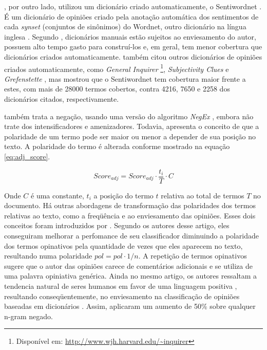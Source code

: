\documentclass[template.tex]{subfiles}
\begin{document}
, por outro lado, utilizou um dicionário criado automaticamente, o Sentiwordnet \cite{esuli2006sentiwordnet}. É um dicionário de opiniões criado pela anotação automática dos sentimentos de cada \textit{synset} (conjuntos de sinônimos) do Wordnet, outro dicionário na língua inglesa \cite{fellbaum2005wordnet}. Segundo , dicionários manuais estão sujeitos ao enviesamento do autor, possuem alto tempo gasto para construí-los e, em geral, tem menor cobertura que dicionários criados automaticamente.  também citou outros dicionários de opiniões criados automaticamente, como \textit{General Inquirer} \cite{stone1966general} \footnote{Disponível em: \url{http://www.wjh.harvard.edu/~inquirer}}, \textit{Subjectivity Clues} \cite{wilson2005recognizing} e \textit{Grefenstette} \cite{grefenstette2004coupling}, mas mostrou que o Sentiwordnet tem cobertura maior frente a estes, com mais de 28000 termos cobertos, contra 4216, 7650 e 2258 dos dicionários citados, respectivamente. 

 também trata a negação, usando uma versão do algoritmo \textit{NegEx} \cite{chapman2001evaluation}, embora não trate dos intensificadores e amenizadores. Todavia,  apresenta o conceito de que a polaridade de um termo pode ser maior ou menor a depender de sua posição no texto. A polaridade do termo é alterada conforme mostrado na equação \ref{eq:adj_score}.

\begin{equation}
Score_{adj} = Score_{adj} \cdot \frac{t_i}{T} \cdot C
\label{eq:adj_score}
\end{equation}

Onde $C$ é uma constante, $t_i$ a posição do termo $t$ relativa ao total de termos $T$ no documento.
Há outras abordagens de transformação das polaridades dos termos relativas ao texto, como a freqüência e ao enviesamento das opiniões. Esses dois conceitos foram introduzidos por . Segundo os autores desse artigo, eles conseguiram melhorar a perfomance de seu classificador diminuindo a polaridade dos termos opinativos pela quantidade de vezes que eles aparecem no texto, resultando numa polaridade $pol = pol \cdot 1/n$. A repetição de termos opinativos sugere que o autor das opiniões carece de comentários adicionais e se utiliza de uma palavra opiniativa genérica. Ainda no mesmo artigo, os autores ressaltam a tendencia natural de seres humanos em favor de uma linguagem positiva \cite{boucher1969pollyanna}, resultando conseqüentemente, no enviesamento na classificação de opiniões baseadas em dicionários \cite{kennedy2006sentiment}. Assim,  aplicaram um aumento de 50\% sobre qualquer n-gram negado.
\end{document}
